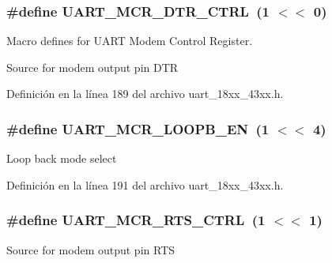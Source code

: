 \subsubsection[{\texorpdfstring{U\+A\+R\+T\+\_\+\+M\+C\+R\+\_\+\+D\+T\+R\+\_\+\+C\+T\+RL}{UART_MCR_DTR_CTRL}}]{\setlength{\rightskip}{0pt plus 5cm}\#define U\+A\+R\+T\+\_\+\+M\+C\+R\+\_\+\+D\+T\+R\+\_\+\+C\+T\+RL~(1 $<$$<$ 0)}\hypertarget{group___u_a_r_t__18_x_x__43_x_x_ga9fdc7f45b2fb3679b64164b34afb9350}{}\label{group___u_a_r_t__18_x_x__43_x_x_ga9fdc7f45b2fb3679b64164b34afb9350}


Macro defines for U\+A\+RT Modem Control Register. 

Source for modem output pin D\+TR 

Definición en la línea 189 del archivo uart\+\_\+18xx\+\_\+43xx.\+h.

\subsubsection[{\texorpdfstring{U\+A\+R\+T\+\_\+\+M\+C\+R\+\_\+\+L\+O\+O\+P\+B\+\_\+\+EN}{UART_MCR_LOOPB_EN}}]{\setlength{\rightskip}{0pt plus 5cm}\#define U\+A\+R\+T\+\_\+\+M\+C\+R\+\_\+\+L\+O\+O\+P\+B\+\_\+\+EN~(1 $<$$<$ 4)}\hypertarget{group___u_a_r_t__18_x_x__43_x_x_ga879d10e97b9b5e01f2b25037aa3d3c96}{}\label{group___u_a_r_t__18_x_x__43_x_x_ga879d10e97b9b5e01f2b25037aa3d3c96}
Loop back mode select 

Definición en la línea 191 del archivo uart\+\_\+18xx\+\_\+43xx.\+h.

\subsubsection[{\texorpdfstring{U\+A\+R\+T\+\_\+\+M\+C\+R\+\_\+\+R\+T\+S\+\_\+\+C\+T\+RL}{UART_MCR_RTS_CTRL}}]{\setlength{\rightskip}{0pt plus 5cm}\#define U\+A\+R\+T\+\_\+\+M\+C\+R\+\_\+\+R\+T\+S\+\_\+\+C\+T\+RL~(1 $<$$<$ 1)}\hypertarget{group___u_a_r_t__18_x_x__43_x_x_gabf6b55840dea19f6dbc8c8c7077796b3}{}\label{group___u_a_r_t__18_x_x__43_x_x_gabf6b55840dea19f6dbc8c8c7077796b3}
Source for modem output pin R\+TS 

